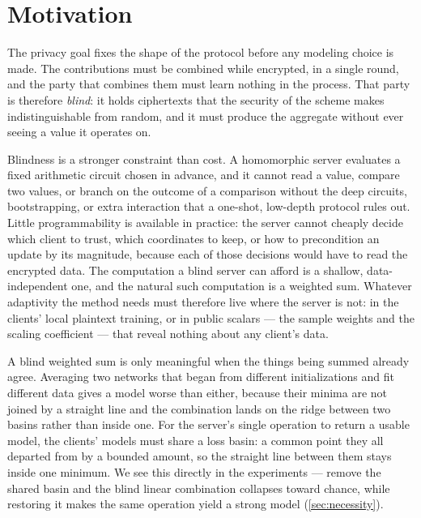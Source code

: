 \section{Motivation}
\label{sec:whyfinetune}

The privacy goal fixes the shape of the protocol before any modeling choice is made. The contributions must
be combined while encrypted, in a single round, and the party that combines them must learn nothing in the
process. That party is therefore \emph{blind}: it holds ciphertexts that the security of the scheme makes
indistinguishable from random, and it must produce the aggregate without ever seeing a value it operates on.

Blindness is a stronger constraint than cost. A homomorphic server evaluates a fixed arithmetic circuit chosen
in advance, and it cannot read a value, compare two values, or branch on the outcome of a comparison without
the deep circuits, bootstrapping, or extra interaction that a one-shot, low-depth protocol rules out. Little
programmability is available in practice: the server cannot cheaply decide which client to trust, which
coordinates to keep, or how to precondition an update by its magnitude, because each of those decisions would
have to read the encrypted data. The computation a blind server can afford is a shallow, data-independent one,
and the natural such computation is a weighted sum. Whatever adaptivity the method needs must therefore live
where the server is not: in the clients' local plaintext training, or in public scalars --- the sample
weights and the scaling coefficient --- that reveal nothing about any client's data.

A blind weighted sum is only meaningful when the things being summed already agree. Averaging two networks
that began from different initializations and fit different data gives a model worse than either, because
their minima are not joined by a straight line and the combination lands on the ridge between two basins
rather than inside one. For the server's single operation to return a usable model, the clients' models must
share a loss basin: a common point they all departed from by a bounded amount, so the straight line between
them stays inside one minimum. We see this directly in the experiments --- remove the shared basin and the
blind linear combination collapses toward chance, while restoring it makes the same operation yield a strong
model (\cref{sec:necessity}).


